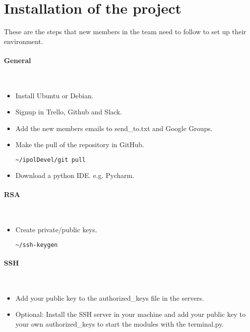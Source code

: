 \section{Installation of the project}


These are the steps that new members in the team need to follow to set up their environment.

\paragraph{General} \hspace{0pt} \\
\begin{itemize}
 \item Install Ubuntu or Debian.
 \item Signup in Trello, Github and Slack.
 \item Add the new members emails to send_to.txt  and Google Groups.
 \item Make the pull of the repository in GitHub.
  \begin{lstlisting}[language=Bash]
  ~/ipolDevel/git pull
  \end{lstlisting}
 \item Download a python IDE. e.g. Pycharm.
\end{itemize}

\paragraph{RSA} \hspace{0pt} \\
\begin{itemize}
 \item Create private/public keys.
  \begin{lstlisting}[language=Bash]
  ~/ssh-keygen
  \end{lstlisting}
\end{itemize}

\paragraph{SSH} \hspace{0pt} \\
\begin{itemize}
 \item Add your public key to the authorized\_keys file in the servers.
 \item Optional: Install the SSH server in your machine and add your public key to your own authorized\_keys to start the modules with the terminal.py.
\end{itemize}

